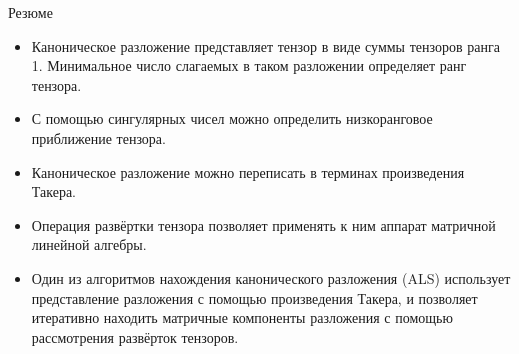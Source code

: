 \begin{frame}{Резюме}
\begin{itemize}
    \item Каноническое разложение представляет тензор в виде суммы тензоров ранга 1. Минимальное число слагаемых в таком разложении определяет ранг тензора.
    \item С помощью сингулярных чисел можно определить низкоранговое приближение тензора.
    \item Каноническое разложение можно переписать в терминах произведения Такера.
    \item Операция развёртки тензора позволяет применять к ним аппарат матричной линейной алгебры.
    \item Один из алгоритмов нахождения канонического разложения (ALS) использует представление разложения с помощью произведения Такера, и позволяет итеративно находить матричные компоненты разложения с помощью рассмотрения развёрток тензоров.
\end{itemize}
\end{frame}
 